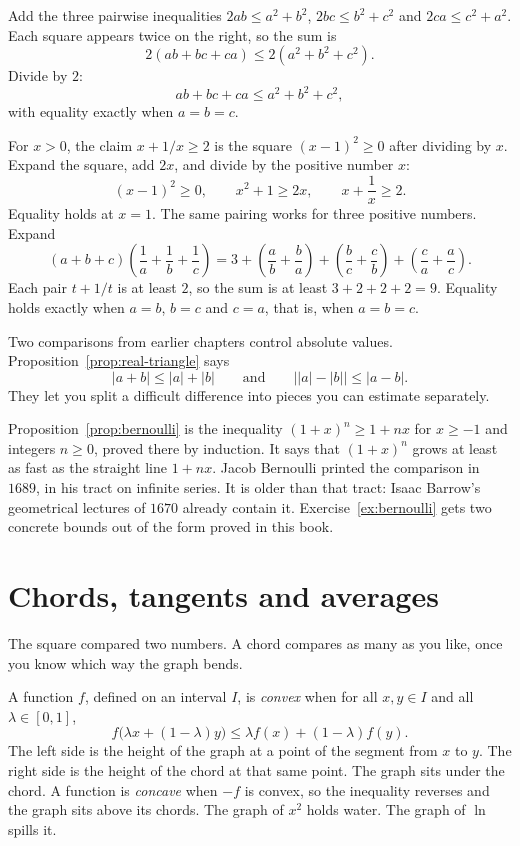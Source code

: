 Add the three pairwise inequalities $2ab\le a^2+b^2$, $2bc\le b^2+c^2$ and $2ca\le c^2+a^2$. Each square appears twice on the right, so the sum is
\[
2(ab+bc+ca)\le 2(a^2+b^2+c^2).
\]
Divide by $2$:
\[
ab+bc+ca\le a^2+b^2+c^2,
\]
with equality exactly when $a=b=c$.

\begin{examplex}
For $x>0$, the claim $x+1/x\ge2$ is the square $(x-1)^2\ge0$ after dividing by $x$. Expand the square, add $2x$, and divide by the positive number $x$:
\[
(x-1)^2\ge0,\qquad x^2+1\ge2x,\qquad x+\frac1x\ge2.
\]
Equality holds at $x=1$. The same pairing works for three positive numbers. Expand
\[
(a+b+c)\left(\frac1a+\frac1b+\frac1c\right)=3+\left(\frac ab+\frac ba\right)+\left(\frac bc+\frac cb\right)+\left(\frac ca+\frac ac\right).
\]
Each pair $t+1/t$ is at least $2$, so the sum is at least $3+2+2+2=9$. Equality holds exactly when $a=b$, $b=c$ and $c=a$, that is, when $a=b=c$.
\end{examplex}

Two comparisons from earlier chapters control absolute values. Proposition~\ref{prop:real-triangle} says
\[
|a+b|\le|a|+|b|\qquad\text{and}\qquad\bigl||a|-|b|\bigr|\le|a-b|.
\]
They let you split a difficult difference into pieces you can estimate separately.

Proposition~\ref{prop:bernoulli} is the inequality $(1+x)^n\ge1+nx$ for $x\ge-1$ and integers $n\ge0$, proved there by induction. It says that $(1+x)^n$ grows at least as fast as the straight line $1+nx$. Jacob Bernoulli printed the comparison in $1689$, in his tract on infinite series. It is older than that tract: Isaac Barrow's geometrical lectures of $1670$ already contain it. Exercise~\ref{ex:bernoulli} gets two concrete bounds out of the form proved in this book.


\section{Chords, tangents and averages}\label{sec:convex}

The square compared two numbers. A chord compares as many as you like, once you know which way the graph bends.

A function $f$, defined on an interval $I$, is \emph{convex} when for all $x,y\in I$ and all $\lambda\in[0,1]$,
\[
f\bigl(\lambda x+(1-\lambda)y\bigr)\le\lambda f(x)+(1-\lambda)f(y).
\]
The left side is the height of the graph at a point of the segment from $x$ to $y$. The right side is the height of the chord at that same point. The graph sits under the chord. A function is \emph{concave} when $-f$ is convex, so the inequality reverses and the graph sits above its chords. The graph of $x^2$ holds water. The graph of $\ln$ spills it.

